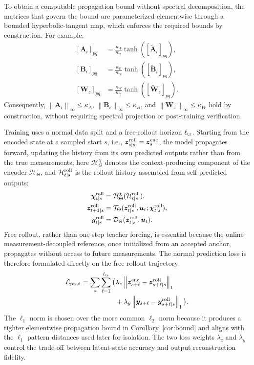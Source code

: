 \documentclass[journal]{IEEEtran}
\newcommand{\norm}[1]{\left\lVert #1\right\rVert}
\newcommand{\1}{\bm 1}
\begin{document}
To obtain a computable propagation bound without spectral decomposition, the
matrices that govern the bound are parameterized elementwise through a bounded
hyperbolic-tangent map, which enforces the required bounds by construction.
For example,
\begin{equation}
\begin{aligned}
[\bm A_i]_{pq}&=\frac{\kappa_A}{m_z}
\tanh([\widetilde{\bm A}_i]_{pq}),\\
[\bm B_i]_{pq}&=\frac{\kappa_B}{m_u}
\tanh([\widetilde{\bm B}_i]_{pq}),\\
[\bm W_z]_{pq}&=\frac{\kappa_W}{m_z}
\tanh([\widetilde{\bm W}_z]_{pq}).
\end{aligned}
\label{eq:hard_bounds}
\end{equation}
Consequently, $\norm{\bm A_i}_\infty\leq\kappa_A$, $\norm{\bm
B_i}_\infty\leq\kappa_B$, and $\norm{\bm W_z}_\infty\leq\kappa_W$ hold by
construction, without requiring spectral projection or post-training
verification.

Training uses a normal data split and a free-rollout horizon $\ell_{\rm tr}$.
Starting from the encoded state at a sampled start $s$, i.e., $\bm
z_{s\mid s}^{\rm roll}=\bm z_s^{\rm enc}$, the model propagates forward,
updating the history from its own predicted outputs rather than from the true
measurements; here $\mathcal H_\Theta^\chi$ denotes the context-producing
component of the encoder $\mathcal H_\Theta$, and $\mathcal H_{t\mid s}^{\rm
roll}$ is the rollout history assembled from self-predicted outputs:
\begin{equation}
\begin{aligned}
\bm\chi_{t\mid s}^{\rm roll}
&=\mathcal H_\Theta^\chi(\mathcal H_{t\mid s}^{\rm roll}),\\
\bm z_{t+1\mid s}^{\rm roll}
&=\mathcal T_\Theta(\bm z_{t\mid s}^{\rm roll},\bm u_t;
\bm\chi_{t\mid s}^{\rm roll}),\\
\bm y_{t\mid s}^{\rm roll}
&=\mathcal D_\Theta(\bm z_{t\mid s}^{\rm roll},\bm u_t).
\end{aligned}
\label{eq:free_rollout}
\end{equation}
Free rollout, rather than one-step teacher forcing, is essential because the
online measurement-decoupled reference, once initialized from an accepted
anchor, propagates without access to future measurements. The normal
prediction loss is therefore formulated directly on the free-rollout
trajectory:
\begin{equation}
\begin{aligned}
\mathcal L_{\rm pred}
=\sum_s\sum_{\ell=1}^{\ell_{\rm tr}}\big(&
\lambda_z\norm{\bm z_{s+\ell}^{\rm enc}
-\bm z_{s+\ell\mid s}^{\rm roll}}_1\\
&+
\lambda_y\norm{\bm y_{s+\ell}
-\bm y_{s+\ell\mid s}^{\rm roll}}_1
\big).
\end{aligned}
\label{eq:prediction_loss}
\end{equation}
The $\ell_1$ norm is chosen over the more common $\ell_2$ norm because it
produces a tighter elementwise propagation bound in Corollary~\ref{cor:bound}
and aligns with the $\ell_1$ pattern distances used later for
isolation. The two loss weights $\lambda_z$ and $\lambda_y$ control the
trade-off between latent-state accuracy and output reconstruction fidelity.
\end{document}
